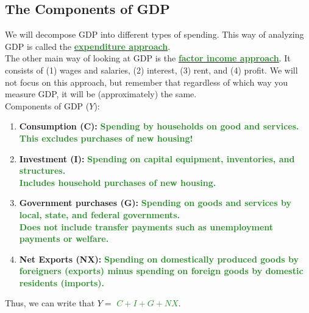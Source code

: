 \documentclass[11pt]{article}\usepackage[]{graphicx}\usepackage[]{color}
\theoremstyle{definition}
\newcommand{\ddp}[1]{{\textbf{\textcolor{ForestGreen}{#1}}}}
\newcommand{\dd}[1]{{\underline{\textbf{\textcolor{ForestGreen}{#1}}}}}
\begin{document}
\subsection{The Components of GDP}

We will decompose GDP into different types of spending. This way of analyzing GDP is called the \dd{expenditure approach}.
\\

The other main way of looking at GDP is the \dd{factor income approach}. It consists of (1) wages and salaries, (2) interest, (3) rent, and (4) profit. We will not focus on this approach, but remember that regardless of which way you measure GDP, it will be (approximately) the same.
\\

Components of GDP ($Y$):

\begin{enumerate}
	\setlength{\itemsep}{1.5em}
	\item \textbf{Consumption (C):} \ddp{Spending by households on good and services. \\ This excludes purchases of new housing!}
	\item \textbf{Investment (I):} \ddp{Spending on capital equipment, inventories, and structures. \\ Includes household purchases of new housing.}
	\item \textbf{Government purchases (G):} \ddp{Spending on goods and services by local, state, and federal governments. \\ Does not include transfer payments such as unemployment payments or welfare.}
	\item \textbf{Net Exports (NX):} \ddp{Spending on domestically produced goods by foreigners (exports) minus spending on foreign goods by domestic residents (imports).}
\end{enumerate}
\vspace{1em}

Thus, we can write that $Y = $ \dd{$C + I + G + NX$}.
\\
\end{document}
